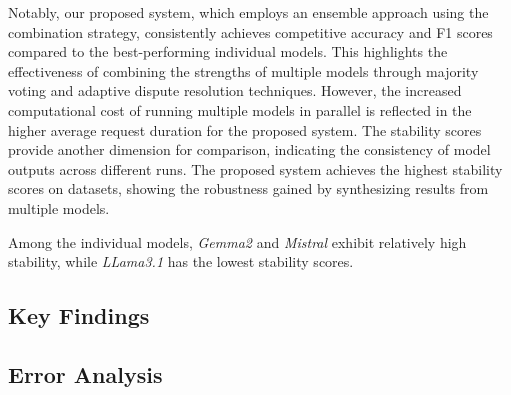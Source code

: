 Notably, our proposed system, which employs an ensemble approach using the combination strategy, consistently achieves competitive accuracy and F1 scores compared to the best-performing individual models.
This highlights the effectiveness of combining the strengths of multiple models through majority voting and adaptive dispute resolution techniques.
However, the increased computational cost of running multiple models in parallel is reflected in the higher average request duration for the proposed system.
The stability scores provide another dimension for comparison, indicating the consistency of model outputs across different runs.
The proposed system achieves the highest stability scores on datasets, showing the robustness gained by synthesizing results from multiple models.

Among the individual models, \textit{Gemma2} and \textit{Mistral} exhibit relatively high stability, while \textit{LLama3.1} has the lowest stability scores.
\subsection{Key Findings}\label{subsec:empirical-evaluation:discussion-of-results:key-findings}
\subsection{Error Analysis}\label{subsec:empirical-evaluation:discussion-of-results:error-analysis}
